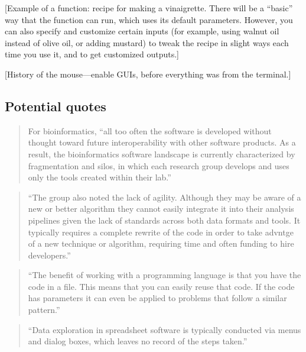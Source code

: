 \documentclass[]{tufte-book}
\begin{document}
{[}Example of a function: recipe for making a vinaigrette. There will be a
``basic'' way that the function can run, which uses its default parameters.
However, you can also specify and customize certain inputs (for example,
using walnut oil instead of olive oil, or adding mustard) to tweak the
recipe in slight ways each time you use it, and to get customized outputs.{]}

{[}History of the mouse---enable GUIs, before everything was from the terminal.{]}

\hypertarget{potential-quotes}{%
\subsection{Potential quotes}\label{potential-quotes}}

\begin{quote}
For bioinformatics, ``all too often the software is developed without
thought toward future interoperability with other software products. As a
result, the bioinformatics software landscape is currently characterized
by fragmentation and silos, in which each research group develops and uses
only the tools created within their lab.'' \citep{barga2011bioinformatics}
\end{quote}

\begin{quote}
``The group also noted the lack of agility. Although they may be aware of
a new or better algorithm they cannot easily integrate it into their
analysis pipelines given the lack of standards across both data formats
and tools. It typically requires a complete rewrite of the code in order
to take advntge of a new technique or algorithm, requiring time and often
funding to hire developers.'' \citep{barga2011bioinformatics}
\end{quote}

\begin{quote}
``The benefit of working with a programming language is that you have the code in
a file. This means that you can easily reuse that code. If the code has
parameters it can even be applied to problems that follow a similar pattern.''
\citep{janssens2014data}
\end{quote}

\begin{quote}
``Data exploration in spreadsheet software is typically conducted via menus and
dialog boxes, which leaves no record of the steps taken.'' \citep{murrell2009introduction}
\end{quote}
\end{document}
